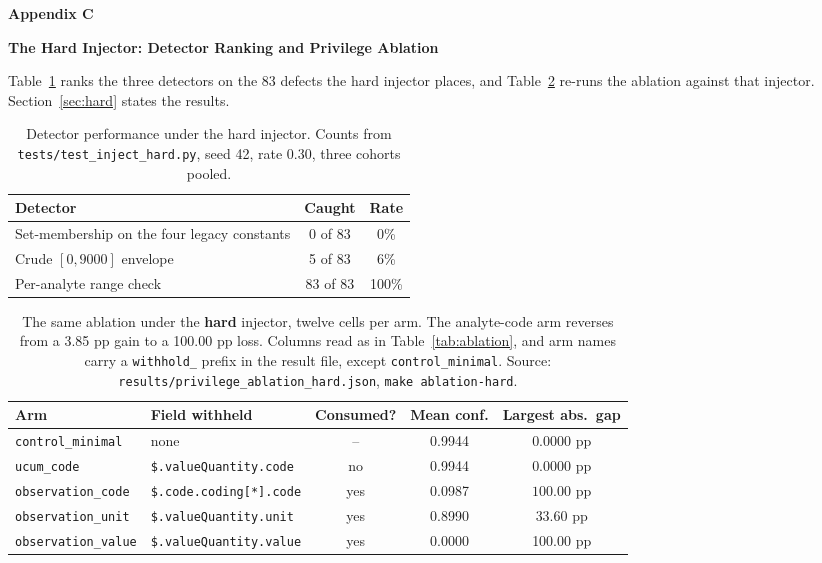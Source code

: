 \newpage
{}
{}
{\centering\normalfont\bfseries\large Appendix C\par}
{\centering\normalfont\bfseries\large The Hard Injector: Detector Ranking and Privilege Ablation\par}
\nopagebreak
\setcounter{table}{0}
\renewcommand{\thetable}{C\arabic{table}}

Table~\ref{tab:detectors} ranks the three detectors on the 83 defects the hard injector places, and
Table~\ref{tab:ablationhard} re-runs the ablation against that injector. Section~\ref{sec:hard}
states the results.

\begin{table}[!ht]
\centering
{}
\caption{Detector performance under the hard injector. Counts from
\texttt{tests/test\_inject\_hard.py}, seed 42, rate 0.30, three cohorts pooled.}
\label{tab:detectors}
\begin{tabular}{lcc}
\toprule
Detector & Caught & Rate \\
\midrule
Set-membership on the four legacy constants & 0 of 83 & 0\% \\
Crude $[0, 9000]$ envelope & 5 of 83 & 6\% \\
Per-analyte range check & 83 of 83 & 100\% \\
\bottomrule
\end{tabular}
\end{table}

\begin{table}[!ht]
\centering
{}
\caption{The same ablation under the \textbf{hard} injector, twelve cells per arm. The analyte-code
arm reverses from a 3.85 pp gain to a 100.00 pp loss. Columns read as in
Table~\ref{tab:ablation}, and arm names carry a \texttt{withhold\_} prefix in the result file,
except \texttt{control\_minimal}. Source:
\texttt{results/privilege\_ablation\_hard.json}, \texttt{make ablation-hard}.}
\label{tab:ablationhard}
\setlength{\tabcolsep}{4pt}\small
\begin{tabular}{llccc}
\toprule
Arm & Field withheld & Consumed? & Mean conf. & Largest abs.\ gap \\
\midrule
\texttt{control\_minimal}  & none                            & --  & 0.9944 & 0.0000 pp \\
\texttt{ucum\_code}       & \texttt{\$.valueQuantity.code}  & no  & 0.9944 & 0.0000 pp \\
\texttt{observation\_code}  & \texttt{\$.code.coding[*].code} & yes & 0.0987 & $\mathbf{100.00}$ pp \\
\texttt{observation\_unit}  & \texttt{\$.valueQuantity.unit}  & yes & 0.8990 & 33.60 pp \\
\texttt{observation\_value} & \texttt{\$.valueQuantity.value} & yes & 0.0000 & 100.00 pp \\
\bottomrule
\end{tabular}
\end{table}

